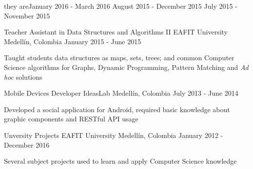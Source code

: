 \begin{cventries}
{\begin{cvsubentries}
{                      they are{\dotsep}}{January 2016 - March 2016}{}
                      {August 2015 - December 2015}{}
                      {July 2015 - November 2015}{}
      \end{cvsubentries}
    }
  \cventry
    {Teacher Assistant in Data Structures and Algorithms II}
    {EAFIT University}
    {Medellín, Colombia}
    {January 2015 - June 2015}
    {
      \begin{cvitems}
        \item {Taught students data structures as maps, sets, trees; and common Computer Science
               algorithms for Graphs, Dynamic Programming, Pattern Matching and \textit{Ad hoc}
               solutions}
      \end{cvitems}
    }
  \cventry
    {Mobile Devices Developer}
    {IdeasLab}
    {Medellín, Colombia}
    {July 2013 - June 2014}
    {
      \begin{cvitems}
        \item {Developed a social application for Android, required basic knowledge about graphic
               components and RESTful API usage}
      \end{cvitems}
      \begin{cvsubentries}
      \end{cvsubentries}
    }
    \cventry
      {Unversity Projects}
      {EAFIT University}
      {Medellín, Colombia}
      {January 2012 - December 2016}
      {
        \begin{cvitems}
          \item {Several subject projects used to learn and apply Computer Science knowledge}
        \end{cvitems}
        \begin{cvsubentries}
        \end{cvsubentries}
      }
\end{cventries}
